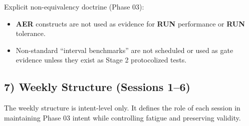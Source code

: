 \documentclass[10pt]{article}
\begin{document}
Explicit non-equivalency doctrine (Phase 03):

\begin{itemize}
\item \textbf{AER} constructs are not used as evidence for \textbf{RUN} performance or \textbf{RUN} tolerance.
\item Non-standard “interval benchmarks” are not scheduled or used as gate evidence unless they exist as Stage 2 protocolized tests.
\end{itemize}

\subsection*{7) Weekly Structure (Sessions 1–6)}

The weekly structure is intent-level only. It defines the role of each session in maintaining Phase 03 intent while controlling fatigue and preserving validity.
\end{document}
